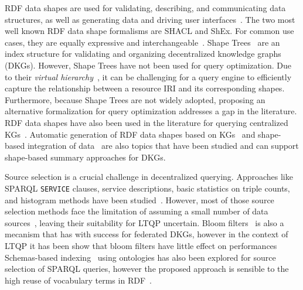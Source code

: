 RDF data shapes are used for validating, describing, and communicating data structures, as well as generating data and driving user interfaces~\cite{Gayo2018a,Gayo2018}.
The two most well known RDF data shape formalisms are SHACL and ShEx.
For common use cases, they are equally expressive and interchangeable~\cite{Gayo2018c}.
Shape Trees~\cite{shapetreesShapeTrees} are an index structure for validating and organizing decentralized knowledge graphs (DKGs).
However, Shape Trees have not been used for query optimization. 
Due to their \emph{virtual hierarchy}~\cite{shapetreesShapeTrees}, it can be challenging for a query engine to efficiently capture the relationship between a resource IRI and its corresponding shapes.
Furthermore, because Shape Trees are not widely adopted, proposing an alternative formalization for query optimization addresses a gap in the literature.
RDF data shapes have also been used in the literature for querying centralized KGs~\cite{kashif2021}.
Automatic generation of RDF data shapes based on KGs~\cite{fernandez2023extracting} and shape-based integration of data~\cite{LabraGayo2023} are also topics that have been studied and can support shape-based summary approaches for DKGs.

Source selection is a crucial challenge in decentralized querying.
Approaches like SPARQL \texttt{SERVICE} clauses, service descriptions, basic statistics on triple counts, and histogram methods have been studied~\cite{hose2012towards, Harth2010}.
However, most of those source selection methods face the limitation of assuming a small number of data sources~\cite{Harth2010}, leaving their suitability for LTQP uncertain.
Bloom filters~\cite{dia2018fast} is also a mecanism that has with success for federated DKGs, however in the context of LTQP it has been show that bloom filters have little effect on performances~\cite{Hanski2024}
Schemas-based indexing~\cite{Stuckenschmidt2004} using ontologies has also been explored for source selection of SPARQL queries,
however the proposed approach is sensible to the high reuse of vocabulary terms in RDF~\cite{Harth2010}.